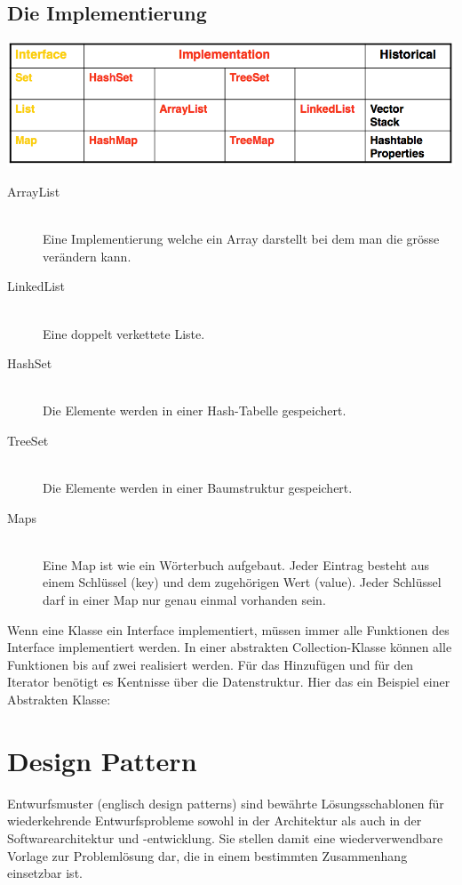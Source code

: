 \documentclass[a4paper, 11pt]{article}
\begin{document}
\subsection{Die Implementierung}
\includegraphics[scale=0.46]{jcf-implementations.png} 
\begin{description}
	\item[ArrayList] \hfill \\ Eine Implementierung welche ein Array darstellt bei dem man die grösse verändern kann.
	\item[LinkedList] \hfill \\ Eine doppelt verkettete Liste.
	\item[HashSet] \hfill \\ Die Elemente werden in einer Hash-Tabelle gespeichert.
	\item[TreeSet] \hfill \\ Die Elemente werden in einer Baumstruktur gespeichert.
	\item[Maps] \hfill \\ Eine Map ist wie ein Wörterbuch aufgebaut. Jeder Eintrag besteht aus einem Schlüssel (key) und dem zugehörigen Wert (value). Jeder Schlüssel darf in einer Map nur genau einmal vorhanden sein.
\end{description}
Wenn eine Klasse ein Interface implementiert, müssen immer alle Funktionen des Interface implementiert werden. In einer abstrakten Collection-Klasse können alle Funktionen bis auf zwei realisiert werden. Für das Hinzufügen und für den Iterator benötigt es Kentnisse über die Datenstruktur. Hier das ein Beispiel einer Abstrakten Klasse:


\section{Design Pattern}
Entwurfsmuster (englisch design patterns) sind bewährte Lösungsschablonen für wiederkehrende Entwurfsprobleme sowohl in der Architektur als auch in der Softwarearchitektur und -entwicklung. Sie stellen damit eine wiederverwendbare Vorlage zur Problemlösung dar, die in einem bestimmten Zusammenhang einsetzbar ist.
\end{document}

